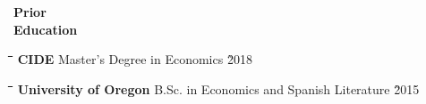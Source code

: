 \documentclass[10pt, oneside]{article}
\newcommand\mytabs{\hspace*{1cm}\=\hspace{1cm}\=\hspace{1cm}\=\hspace{1cm}\=\hspace{1cm}\=\hspace{1cm}\=\hspace{1cm}\=\hspace{1cm}\=\hspace{1cm}\=\hspace{1cm}}
\newenvironment{mysec}[1][\mytabs]
  {\begin{tabbing}#1\kill\ignorespaces}
  {\end{tabbing}}
\begin{document}


\begin{minipage}[t]{0.1\linewidth}
\textbf{Prior \\ Education}
\end{minipage}\hspace{0.05\linewidth}
\begin{minipage}[t]{0.8\linewidth}
\begin{mysec} 
    \textbf{CIDE} \>\>\>\>\> Master's Degree in Economics \` 2018
    \end{mysec} 
\begin{mysec} 
\textbf{University of Oregon} \>\>\>\>\> B.Sc. in Economics and Spanish Literature \` 2015 
\end{mysec} 
\end{minipage}\vspace{5mm}
\end{document}
